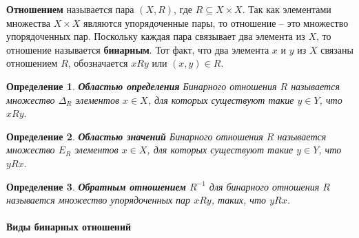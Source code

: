\documentclass{article}
\newtheorem{definition}{Определение}
\begin{document}
\textbf{Отношением} называется пара $(X, R)$, где $R \subseteq X \times X$. Так как элементами множества $X \times X$ являются упорядоченные пары, то отношение – это множество упорядоченных пар. Поскольку каждая пара связывает два элемента из $X$, то отношение называется \textbf{бинарным}. Тот факт, что два элемента $x$ и $y$ из $X$ связаны отношением $R$, обозначается $x R y$ или $(x, y) \in R$.

\begin{definition}
    \textbf{Областью определения} Бинарного отношения $R$ называется множество $\Delta_{R}$ элементов $x \in X$, для которых существуют такие $y \in Y$, что $x R y$.
\end{definition}

\begin{definition}
    \textbf{Областью значений} Бинарного отношения $R$ называется множество $E_{R}$ элементов $x \in X$, для которых существуют такие $y \in Y$, что $y R x$.
\end{definition}

\begin{definition}
    \textbf{Обратным отношением} $R^{-1}$ для бинарного отношения  $R$ называется множество упорядоченных пар $xRy$, таких, что $yRx$.
\end{definition}

\paragraph{Виды бинарных отношений}
\end{document}
